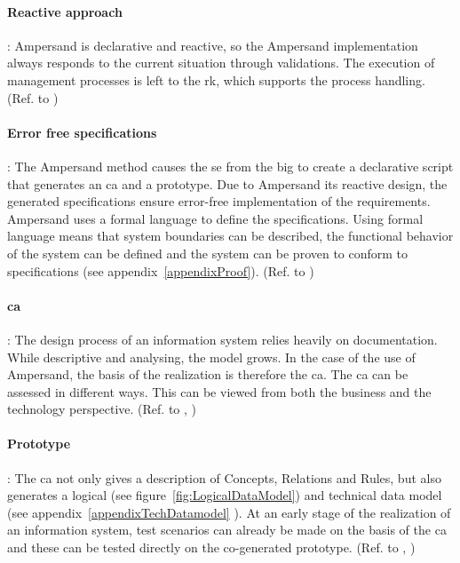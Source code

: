 \paragraph{\textbf{Reactive approach}}\label{swot:s_reactive_approach}:
Ampersand is declarative and reactive, so the Ampersand implementation always responds to the current situation through validations.
The execution of management processes is left to the \acrshort{rk}, which supports the process handling.
(Ref. to )

\paragraph{\textbf{Error free specifications}}\label{swot:s_error_free_specifications}:
The Ampersand method causes the \acrshort{se} from the \acrshort{big} to create a declarative script that generates an \acrshort{ca} and a prototype.
Due to Ampersand its reactive design, the generated specifications ensure error-free implementation of the requirements.
Ampersand uses a formal language to define the specifications.
Using formal language means that system boundaries can be described, the functional behavior of the system can be defined and the system can be proven to conform to specifications (see appendix~\ref{appendixProof}).
(Ref. to )

\paragraph{\textbf{\acrlong{ca}}}\label{swot:s_conceptual_analysis}:
The design process of an information system relies heavily on documentation.
While descriptive and analysing, the model grows.
In the case of the use of Ampersand, the basis of the realization is therefore the \acrshort{ca}.
The \acrshort{ca} can be assessed in different ways.
This can be viewed from both the business and the technology perspective.
(Ref. to , )

\paragraph{\textbf{Prototype}}\label{swot:s_prototype}:
The \acrshort{ca} not only gives a description of Concepts, Relations and Rules, but also generates a logical (see figure~\ref{fig:LogicalDataModel}) and technical data model (see appendix~\ref{appendixTechDatamodel} ).
At an early stage of the realization of an information system, test scenarios can already be made on the basis of the \acrshort{ca} and these can be tested directly on the co-generated prototype.
(Ref. to , )

